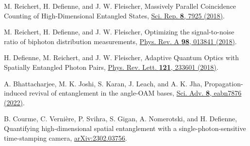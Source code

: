 \documentclass[pra,english,reprint,nofootinbib,aps,superscriptaddress,showpacs,showkeys]{revtex4-2}
\theoremstyle{definition}
\theoremstyle{remark}
\begin{document}
\begin{thebibliography}{99}
		M. Reichert, H. Defienne, and J. W. Fleischer,
		Massively Parallel Coincidence Counting of High-Dimensional Entangled States,
		\href{https://doi.org/10.1038/s41598-018-26144-7}{Sci. Rep. \textbf{8}, 7925 (2018)}.
		
		M. Reichert, H. Defienne, and J. W. Fleischer,
		Optimizing the signal-to-noise ratio of biphoton distribution measurements,
		\href{https://doi.org/10.1103/PhysRevA.98.013841}{Phys. Rev. A \textbf{98}, 013841 (2018)}.
		
		H. Defienne, M. Reichert, and J. W. Fleischer,
		Adaptive Quantum Optics with Spatially Entangled Photon Pairs,
		\href{https://doi.org/10.1103/PhysRevLett.121.233601}{Phys. Rev. Lett. \textbf{121}, 233601 (2018)}.
		
		A. Bhattacharjee, M. K. Joshi, S. Karan, J. Leach, and A. K. Jha,
		Propagation-induced revival of entanglement in the angle-OAM bases,
		\href{https://doi.org/10.1126/sciadv.abn7876}{Sci. Adv. \textbf{8}, eabn7876 (2022)}.
		
		B. Courme, C. Verni\`ere, P. Svihra, S. Gigan, A. Nomerotski, and H. Defienne,
		Quantifying high-dimensional spatial entanglement with a single-photon-sensitive time-stamping camera,
		\href{https://doi.org/10.48550/arXiv.2302.03756}{arXiv:2302.03756}.
		
	\end{thebibliography}
	
\end{document}
